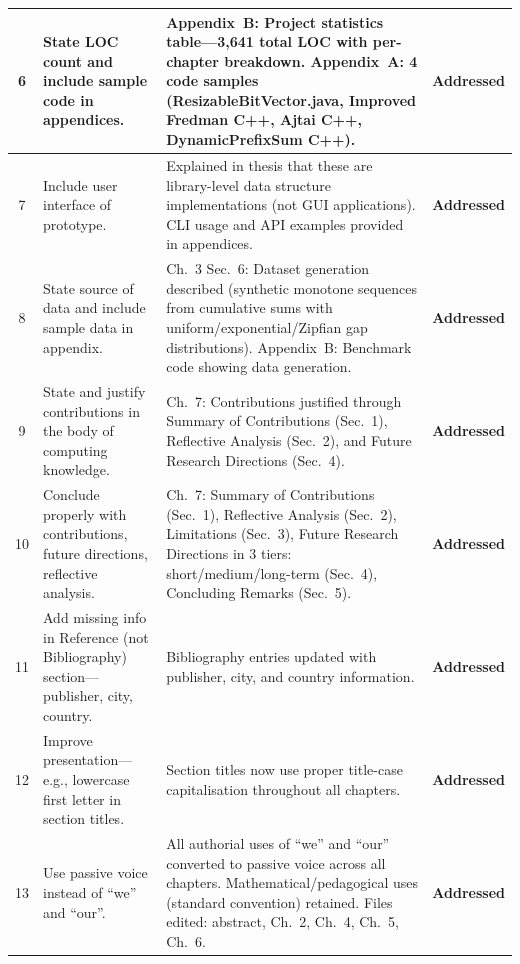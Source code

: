 \documentclass[12pt,a4paper]{article}
\newcommand{\addressed}{\textbf{Addressed}}
\begin{document}
\begin{longtable}{@{}c L{4.8cm} L{7.2cm} L{2.2cm}@{}}
6 &
State LOC count and include sample code in appendices. &
Appendix~B: Project statistics table---3,641 total LOC with per-chapter breakdown. Appendix~A: 4 code samples (ResizableBitVector.java, Improved Fredman C++, Ajtai C++, DynamicPrefixSum C++). &
\addressed \\
\midrule

7 &
Include user interface of prototype. &
Explained in thesis that these are library-level data structure implementations (not GUI applications). CLI usage and API examples provided in appendices. &
\addressed \\
\midrule

8 &
State source of data and include sample data in appendix. &
Ch.~3 Sec.~6: Dataset generation described (synthetic monotone sequences from cumulative sums with uniform/exponential/Zipfian gap distributions). Appendix~B: Benchmark code showing data generation. &
\addressed \\
\midrule

9 &
State and justify contributions in the body of computing knowledge. &
Ch.~7: Contributions justified through Summary of Contributions (Sec.~1), Reflective Analysis (Sec.~2), and Future Research Directions (Sec.~4). &
\addressed \\
\midrule

10 &
Conclude properly with contributions, future directions, reflective analysis. &
Ch.~7: Summary of Contributions (Sec.~1), Reflective Analysis (Sec.~2), Limitations (Sec.~3), Future Research Directions in 3 tiers: short/medium/long-term (Sec.~4), Concluding Remarks (Sec.~5). &
\addressed \\
\midrule

11 &
Add missing info in Reference (not Bibliography) section---publisher, city, country. &
Bibliography entries updated with publisher, city, and country information. &
\addressed \\
\midrule

12 &
Improve presentation---e.g., lowercase first letter in section titles. &
Section titles now use proper title-case capitalisation throughout all chapters. &
\addressed \\
\midrule

13 &
Use passive voice instead of ``we'' and ``our''. &
All authorial uses of ``we'' and ``our'' converted to passive voice across all chapters. Mathematical/pedagogical uses (standard convention) retained. Files edited: abstract, Ch.~2, Ch.~4, Ch.~5, Ch.~6. &
\addressed \\
\midrule


\end{longtable}
\end{document}
